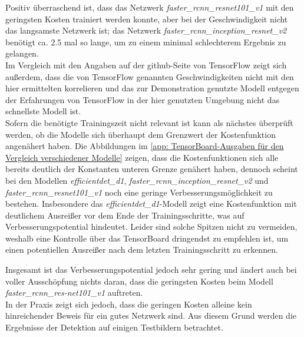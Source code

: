 \documentclass[12pt, oneside]{article}
\begin{document}
Positiv überraschend ist, dass das Netzwerk \textit{faster\_rcnn\_resnet101\_v1} mit den geringsten Kosten trainiert werden konnte, aber bei der Geschwindigkeit nicht das langsamste Netzwerk ist; das Netzwerk \textit{faster\_rcnn\_inception\_resnet\_v2} benötigt ca. 2.5 mal so lange, um zu einem minimal schlechterem Ergebnis zu gelangen.\\

Im Vergleich mit den Angaben auf der github-Seite von TensorFlow zeigt sich außerdem, dass die von TensorFlow genannten Geschwindigkeiten nicht mit den hier ermittelten korrelieren und das zur Demonstration genutzte Modell entgegen der Erfahrungen von TensorFlow in der hier genutzten Umgebung nicht das schnellste Modell ist.\\

Sofern die benötigte Trainingszeit nicht relevant ist kann als nächstes überprüft werden, ob die Modelle sich überhaupt dem Grenzwert der Kostenfunktion angenähert haben. Die Abbildungen im \autoref{app: TensorBoard-Ausgaben für den Vergleich verschiedener Modelle} zeigen, dass die Kostenfunktionen sich alle bereits deutlich der Konstanten unteren Grenze genähert haben, dennoch scheint bei den Modellen \textit{efficientdet\_d1}, \textit{faster\_rcnn\_inception\_resnet\_v2} und \textit{faster\_rcnn\_resnet101\_v1} noch eine geringe Verbesserungsmöglichkeit zu bestehen. Insbesondere das \textit{efficientdet\_d1}-Modell zeigt eine Kostenfunktion mit deutlichem Ausreißer vor dem Ende der Trainingsschritte, was auf Verbesserungspotential hindeutet. Leider sind solche Spitzen nicht zu vermeiden, weshalb eine Kontrolle über das TensorBoard dringendst zu empfehlen ist, um einen potentiellen Ausreißer nach dem letzten Trainingsschritt zu erkennen.

Insgesamt ist das Verbesserungspotential jedoch sehr gering und ändert auch bei voller Ausschöpfung nichts daran, dass die geringsten Kosten beim Modell \textit{faster\_rcnn\_res-net101\_v1} auftreten.\\

In der Praxis zeigt sich jedoch, dass die geringen Kosten alleine kein hinreichender Beweis für ein gutes Netzwerk sind. Aus diesem Grund werden die Ergebnisse der Detektion auf einigen Testbildern betrachtet.
\end{document}
